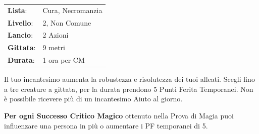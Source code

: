 \begin{multicols}{2}




\noindent\begin{tabularx}{\linewidth}{p{1.3cm}X}
	\rowcolor{gray!20}\textbf{Lista}: & Cura, Necromanzia \\
	\textbf{Livello}: & 2, Non Comune \\
	\rowcolor{gray!20}\textbf{Lancio}: & 2 Azioni \\
	\textbf{Gittata}: & 9 metri \\
	\rowcolor{gray!20}\textbf{Durata}: & 1 ora per CM \\
\end{tabularx}\smallskip


Il tuo incantesimo aumenta la robustezza e risolutezza dei tuoi alleati. Scegli fino a tre creature a gittata, per la durata prendono 5 Punti Ferita Temporanei. Non è possibile ricevere più di un incantesimo Aiuto al giorno.

\textbf{Per ogni Successo Critico Magico} ottenuto nella Prova di Magia puoi influenzare una persona in più o aumentare i PF temporanei di 5.


\end{multicols}
